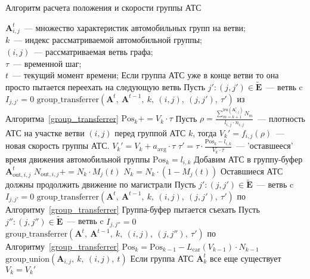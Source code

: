 \begin{algorithm}[!ht]
    \caption{Алгоритм расчета положения и скорости группы АТС}
    \label{group_mover}
    \begin{algorithmic}
        \REQUIRE \(\mathbf{A}^t_{i,j}\)~--- множество характеристик автомобильных групп на ветви; \\
                 $k$~--- индекс рассматриваемой автомобильной группы; \\
                 $(i,j)$~--- рассматриваемая ветвь графа; \\
                 $\tau$~--- временной шаг; \\
                 $t$~--- текущий момент времени;
            \STATE Если группа АТС уже в конце ветви то она просто пытается переехать на следующую ветвь
            \STATE Пусть $j' : (j, j') \in \mathbf{\widetilde{E}}$~--- ветвь c $I_{j, j'} = 0$
            \STATE $\text{group\_transferrer}(\mathbf{A}^t,\ \mathbf{A}^{t-1},\ k,\ (i,j),\ (j,j'),\ \tau')$ из Алгоритма~\ref{group_transferrer}
        \ENDIF
        \STATE $\mathrm{Pos}_k += V_k \cdot \tau$
        \STATE Пусть $\rho = \frac{\sum_{m=k+1}^{\text{len}(\mathbf{A}^t_{i,j})} N_m}{l_{i,j} \cdot n_{i,j}}$~--- плотность АТС на участке ветви $(i,j)$ перед группой АТС $k$, тогда $V_k' = f_{i,j}(\rho)$~--- новая скорость группы АТС.
            \STATE $V_k' = V_k + a_\text{avg} \cdot \tau$
        \ENDIF
            \STATE $\tau' = \tau \cdot \frac{\mathrm{Pos}_k - l_{i,k}}{V_k \cdot \tau}$~--- 'оставшееся' время движения автомобильной группы
            \STATE $\mathrm{Pos}_k = l_{i,k}$
            \STATE Добавим АТС в группу-буфер $\mathbf{A}^t_{\text{out}, i, j}$
            \STATE $N_{\text{out}, i, j} += N_k \cdot M_j(t)$
            \STATE $N_k = N_k \cdot (1 - M_j(t))$
            \STATE Оставшиеся АТС должны продолжить движение по магистрали
            \STATE Пусть $j' : (j, j') \in \mathbf{\widetilde{E}}$~--- ветвь c $I_{j, j'} = 0$
            \STATE $\text{group\_transferrer}(\mathbf{A}^t,\ \mathbf{A}^{t-1},\ k,\ (i,j),\ (j,j'),\ \tau')$ по Алгоритму~\ref{group_transferrer}
            \STATE Группа-буфер пытается съехать
            \STATE Пусть $j'' : (j, j'') \in \mathbf{\widetilde{E}}$~--- ветвь c $I_{j, j''} = 0$
            \STATE $\text{group\_transferrer}(\mathbf{A}^t,\ \mathbf{A}^{t-1},\ k,\ (i,j),\ (j,j''),\ \tau')$ по Алгоритму~\ref{group_transferrer}
        \ELSE
                \STATE $\mathrm{Pos}_k = \mathrm{Pos}_{k-1} - L_\text{car}(V_{k-1}) \cdot N_{k-1}$
            \ENDIF
            \STATE $\text{group\_union}(\mathbf{A}_{i,j},\ k,\ (i,j),\ t)$
        \ENDIF
        \STATE Если группа АТС $\mathbf{A}^t_k$ все еще существует $V_k = V_k'$
    \end{algorithmic}
\end{algorithm}

